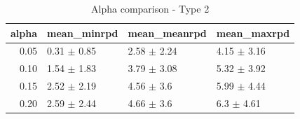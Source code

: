 \begin{table}[ht]
\centering
\begin{tabular}{rlll}
  \hline
alpha & mean_minrpd & mean_meanrpd & mean_maxrpd \\ 
  \hline
0.05 & 0.31 $\pm$ 0.85 & 2.58 $\pm$ 2.24 & 4.15 $\pm$ 3.16 \\ 
  0.10 & 1.54 $\pm$ 1.83 & 3.79 $\pm$ 3.08 & 5.32 $\pm$ 3.92 \\ 
  0.15 & 2.52 $\pm$ 2.19 & 4.56 $\pm$ 3.6 & 5.99 $\pm$ 4.44 \\ 
  0.20 & 2.59 $\pm$ 2.44 & 4.66 $\pm$ 3.6 & 6.3 $\pm$ 4.61 \\ 
   \hline
\end{tabular}
\caption{Alpha comparison - Type 2} 
\end{table}
